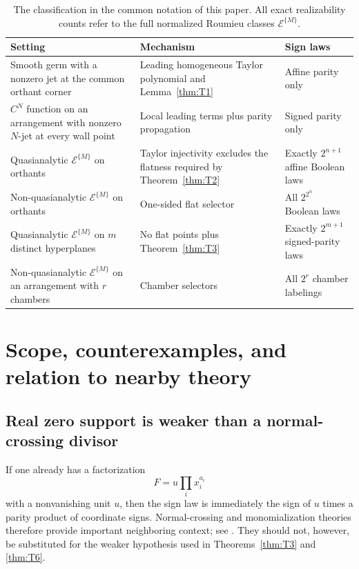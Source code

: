\documentclass[11pt]{article}
\theoremstyle{definition}
\theoremstyle{remark}
\begin{document}
\begin{table}[t]
\centering
\caption{The classification in the common notation of this paper. All exact realizability counts refer to the full normalized Roumieu classes $\mathcal{E}^{\{M\}}$.}
\label{tab:summary}
\begin{tabularx}{\textwidth}{@{}>{\raggedright\arraybackslash}p{}X>{\raggedright\arraybackslash}p{}@{}}
\toprule
Setting & Mechanism & Sign laws \\
\midrule
Smooth germ with a nonzero jet at the common orthant corner & Leading homogeneous Taylor polynomial and Lemma~\ref{thm:T1} & Affine parity only \\
$C^N$ function on an arrangement with nonzero $N$-jet at every wall point & Local leading terms plus parity propagation & Signed parity only \\
Quasianalytic $\mathcal{E}^{\{M\}}$ on orthants & Taylor injectivity excludes the flatness required by Theorem~\ref{thm:T2} & Exactly $2^{n+1}$ affine Boolean laws \\
Non-quasianalytic $\mathcal{E}^{\{M\}}$ on orthants & One-sided flat selector & All $2^{2^n}$ Boolean laws \\
Quasianalytic $\mathcal{E}^{\{M\}}$ on $m$ distinct hyperplanes & No flat points plus Theorem~\ref{thm:T3} & Exactly $2^{m+1}$ signed-parity laws \\
Non-quasianalytic $\mathcal{E}^{\{M\}}$ on an arrangement with $r$ chambers & Chamber selectors & All $2^r$ chamber labelings \\
\bottomrule
\end{tabularx}
\end{table}

\section{Scope, counterexamples, and relation to nearby theory}\label{sec:scope}

\subsection{Real zero support is weaker than a normal-crossing divisor}

If one already has a factorization
\[
 F=u\prod_i x_i^{a_i}
\]
with a nonvanishing unit $u$, then the sign law is immediately the sign of $u$ times a parity product of coordinate signs. Normal-crossing and monomialization theories therefore provide important neighboring context; see \cite{BierstoneMilman2004,BelottoBierstone2023}. They should not, however, be substituted for the weaker hypothesis used in Theorems~\ref{thm:T3} and \ref{thm:T6}.
\end{document}
